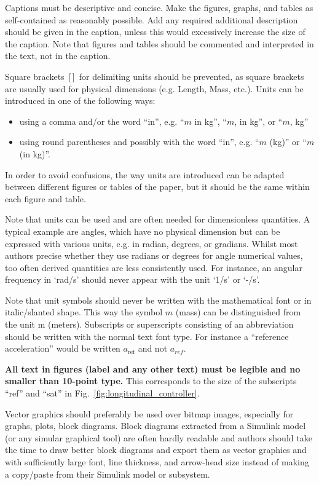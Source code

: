 \documentclass{CEAS_EuroGNC_2024}
\begin{document}
Captions must be descriptive and concise. Make the figures, graphs, and tables as self-contained as reasonably possible. Add any required additional description should be given in the caption, unless this would excessively increase the size of the caption. Note that figures and tables should be commented and interpreted in the text, not in the caption. 

Square brackets\, [\,]\, for delimiting units should be prevented, as square brackets are usually used for physical dimensions (e.g. Length, Mass, etc.). Units can be introduced in one of the following ways:\begin{itemize}
\item using a comma and/or the word ``in'', e.g. ``$m$ in kg'', ``$m$, in kg'', or ``$m$, kg''
\item using round parentheses and possibly with the word ``in'', e.g. ``$m$ (kg)'' or ``$m$ (in kg)''.
\end{itemize}
In order to avoid confusions, the way units are introduced can be adapted between different figures or tables of the paper, but it should be the same within each figure and table.

Note that units can be used and are often needed for dimensionless quantities. A typical example are angles, which have no physical dimension but can be expressed with various units, e.g. in radian, degrees, or gradians. Whilst most authors precise whether they use radians or degrees for angle numerical values, too often derived quantities are less consistently used. For instance, an angular frequency in `rad/s' should never appear with the unit `1/s' or `-/s'.

Note that unit symbols should never be written with the mathematical font or in italic/slanted shape. This way the symbol $m$ (mass) can be distinguished from the unit m (meters). Subscripts or superscripts consisting of an abbreviation should be written with the normal text font type. For instance a ``reference acceleration'' would be written $a_\text{ref}$ and not $a_{ref}$.

\textbf{All text in figures (label and any other text) must be legible and no smaller than 10-point type.} This corresponds to the size of the subscripts ``ref'' and ``sat'' in Fig.~\ref{fig:longitudinal_controller}.

Vector graphics should preferably be used over bitmap images, especially for graphs, plots, block diagrams. Block diagrams extracted from a Simulink model (or any simular graphical tool) are often hardly readable and authors should take the time to draw better block diagrams and export them as vector graphics and with sufficiently large font, line thickness, and arrow-head size instead of making a copy/paste from their Simulink model or subsystem.
\end{document}
